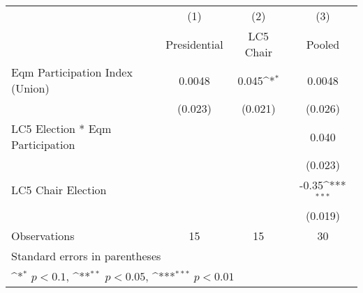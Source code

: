 {
\def\sym#1{\ifmmode^{#1}\else\(^{#1}\)\fi}
\begin{tabular}{l*{3}{c}}
\toprule
                &\multicolumn{1}{c}{(1)}&\multicolumn{1}{c}{(2)}&\multicolumn{1}{c}{(3)}\\
                &\multicolumn{1}{c}{Presidential}&\multicolumn{1}{c}{LC5 Chair}&\multicolumn{1}{c}{Pooled}\\
\midrule
Eqm Participation Index (Union)&   0.0048         &    0.045\sym{*}  &   0.0048         \\
                &  (0.023)         &  (0.021)         &  (0.026)         \\
LC5 Election * Eqm Participation&                  &                  &    0.040         \\
                &                  &                  &  (0.023)         \\
LC5 Chair Election&                  &                  &    -0.35\sym{***}\\
                &                  &                  &  (0.019)         \\
\midrule
Observations    &       15         &       15         &       30         \\
\bottomrule
\multicolumn{4}{l}{\footnotesize Standard errors in parentheses}\\
\multicolumn{4}{l}{\footnotesize \sym{*} \(p<0.1\), \sym{**} \(p<0.05\), \sym{***} \(p<0.01\)}\\
\end{tabular}
}
